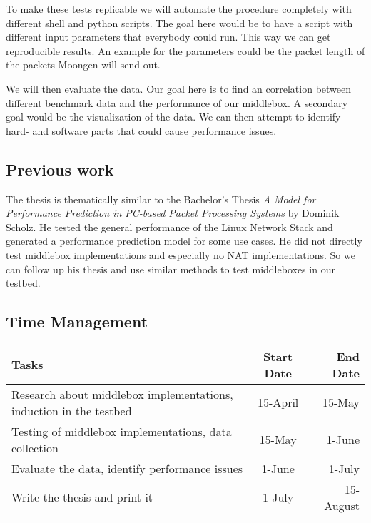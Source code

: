 \documentclass[NET,a4,12pt,ngerman]{netforms}
\begin{document}
To make these tests replicable we will automate the procedure completely with different shell and python scripts. The goal here would be to have a script with different input parameters that everybody could run. This way we can get reproducible results. An example for the parameters could be the packet length of the packets Moongen will send out. 

We will then evaluate the data. Our goal here is to find an correlation between different benchmark data and the performance of our middlebox. A secondary goal would be the visualization of the data. We can then attempt to identify hard- and software parts that could cause performance issues. 


\subsection*{Previous work}

The thesis is thematically similar to the Bachelor's Thesis \emph{A Model for Performance Prediction
in PC-based Packet Processing Systems} \cite{WORK:1} by
Dominik Scholz. He tested the general performance of the Linux Network Stack and generated a performance prediction model for some use cases. 
He did not directly test middlebox implementations and especially no NAT implementations. So we can follow up his thesis and use similar methods to test middleboxes in our testbed. 


\subsection*{Time Management}
 \begin{tabular}{| l | c | r |}
 	\hline 
 	\textbf{Tasks} & \textbf{Start Date} & \textbf{End Date}  \\ \hline
	Research about middlebox implementations, induction in the testbed & 15-April & 15-May \\ \hline
	Testing of middlebox implementations, data collection & 15-May & 1-June \\ \hline
	Evaluate the data, identify performance issues & 1-June & 1-July \\ \hline
	Write the thesis and print it & 1-July & 15-August \\ 
	\hline
 \end{tabular}




\end{document}

